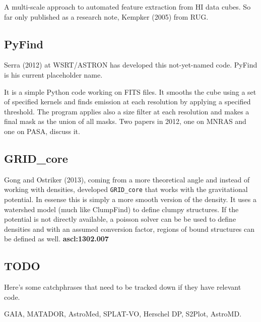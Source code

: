 \documentclass[preprint]{aastex} %
\begin{document}
A multi-scale approach to automated feature extraction from HI
data cubes. 
So far only published as a research note, Kempker (2005) from RUG.


\subsection{PyFind}

Serra (2012) at WSRT/ASTRON
has developed this not-yet-named code. PyFind is his current 
placeholder name. 

It is a simple Python code working on FITS files. It smooths
the cube using a set of specified kernels and finds emission at each
resolution by applying a specified threshold. The program applies also
a size filter at each resolution and makes a final mask as the union
of all masks. Two papers in 2012, one on MNRAS and one on PASA, discuss
it.

\subsection{GRID\_core}

Gong and Ostriker (2013),
coming from a more theoretical angle and 
instead of working with densities, developed 
{\tt GRID\_core} that works with
the gravitational potential.
In essense this is simply a more smooth version of
the density. It uses a watershed model (much like ClumpFind)
to define clumpy structures.  If the potential is not directly
available, a poisson solver can be be used to define densities
and with an assumed conversion factor, regions of bound structures
can be defined as well.  {\bf ascl:1302.007}


\subsection{TODO}

Here's some catchphrases that need to be tracked down if they have
relevant code.

GAIA, MATADOR, AstroMed, SPLAT-VO, Herschel DP, S2Plot, AstroMD. 
\end{document}

